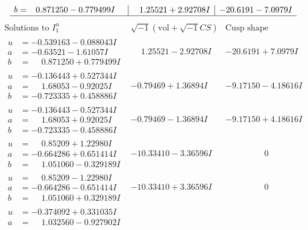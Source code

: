 \documentclass[1p]{elsarticle_modified}
\theoremstyle{definition}
\newcommand{\I}{\sqrt{-1}}
\begin{document}
$$\begin{array}{c|c|c}
\begin{aligned}
b &= \phantom{-}0.871250 - 0.779499 I\end{aligned}
 & \phantom{-}1.25521 + 2.92708 I & -20.6191 - 7.0979 I\\
 \hline 
 \end{array}$$\newpage$$\begin{array}{c|c|c}  
\text{Solutions to }I^u_{1}& \I (\text{vol} + \sqrt{-1}CS) & \text{Cusp shape}\\
 \hline 
\begin{aligned}
u &= -0.539163 - 0.088043 I \\
a &= -0.63521 - 1.61057 I \\
b &= \phantom{-}0.871250 + 0.779499 I\end{aligned}
 & \phantom{-}1.25521 - 2.92708 I & -20.6191 + 7.0979 I \\ \hline\begin{aligned}
u &= -0.136443 + 0.527344 I \\
a &= \phantom{-}1.68053 - 0.92025 I \\
b &= -0.723335 + 0.458886 I\end{aligned}
 & -0.79469 + 1.36894 I & -9.17150 - 4.18616 I \\ \hline\begin{aligned}
u &= -0.136443 - 0.527344 I \\
a &= \phantom{-}1.68053 + 0.92025 I \\
b &= -0.723335 - 0.458886 I\end{aligned}
 & -0.79469 - 1.36894 I & -9.17150 + 4.18616 I \\ \hline\begin{aligned}
u &= \phantom{-}0.85209 + 1.22980 I \\
a &= -0.664286 + 0.651414 I \\
b &= \phantom{-}1.051060 - 0.329189 I\end{aligned}
 & -10.33410 - 3.36596 I & \phantom{-0.000000 } 0 \\ \hline\begin{aligned}
u &= \phantom{-}0.85209 - 1.22980 I \\
a &= -0.664286 - 0.651414 I \\
b &= \phantom{-}1.051060 + 0.329189 I\end{aligned}
 & -10.33410 + 3.36596 I & \phantom{-0.000000 } 0 \\ \hline\begin{aligned}
u &= -0.374092 + 0.331035 I \\
a &= \phantom{-}1.032560 - 0.927902 I \\

\end{aligned}
\end{array}$$
\end{document}
